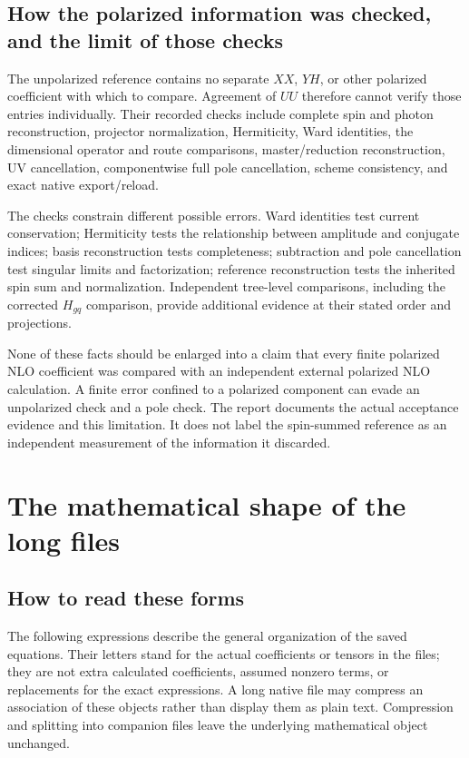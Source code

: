 \documentclass[11pt,a4paper]{article}
\begin{document}
\subsection{How the polarized information was checked, and the limit of those checks}
The unpolarized reference contains no separate $XX$, $YH$, or other polarized coefficient with which to compare. Agreement of $UU$ therefore cannot verify those entries individually. Their recorded checks include complete spin and photon reconstruction, projector normalization, Hermiticity, Ward identities, the dimensional operator and route comparisons, master/reduction reconstruction, UV cancellation, componentwise full pole cancellation, scheme consistency, and exact native export/reload.

The checks constrain different possible errors. Ward identities test current conservation; Hermiticity tests the relationship between amplitude and conjugate indices; basis reconstruction tests completeness; subtraction and pole cancellation test singular limits and factorization; reference reconstruction tests the inherited spin sum and normalization. Independent tree-level comparisons, including the corrected $H_{gq}$ comparison, provide additional evidence at their stated order and projections.

None of these facts should be enlarged into a claim that every finite polarized NLO coefficient was compared with an independent external polarized NLO calculation. A finite error confined to a polarized component can evade an unpolarized check and a pole check. The report documents the actual acceptance evidence and this limitation. It does not label the spin-summed reference as an independent measurement of the information it discarded.

\section{The mathematical shape of the long files}
\subsection{How to read these forms}
The following expressions describe the general organization of the saved equations. Their letters stand for the actual coefficients or tensors in the files; they are not extra calculated coefficients, assumed nonzero terms, or replacements for the exact expressions. A long native file may compress an association of these objects rather than display them as plain text. Compression and splitting into companion files leave the underlying mathematical object unchanged.
\end{document}
